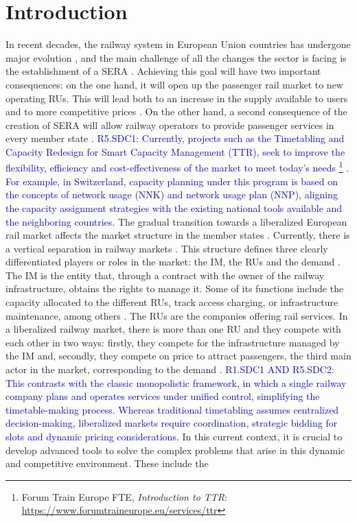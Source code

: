 \documentclass[Afour,sagev,times]{sagej}
\newcommand{\primero}[1]{\textcolor{blue}{#1}}
\newcommand{\quinto}[1]{\textcolor{blue}{#1}}
\begin{document}
\maketitle

\section{Introduction}
\label{sec:introduction}
In recent decades, the railway system in European Union countries has undergone major evolution \cite{Ait2021}, and the main challenge of all the changes the sector is facing is the establishment of a \gls{SERA} \cite{COM2011}. Achieving this goal will have two important consequences: on the one hand, it will open up the passenger rail market to new operating \glspl{RU}. This will lead both to an increase in the supply available to users and to more competitive prices \cite{Caramello2017}. On the other hand, a second consequence of the creation of \gls{SERA} will allow railway operators to provide passenger services in every member state \cite{Caramello2017}. \quinto{R5.SDC1: Currently, projects such as the Timetabling and Capacity Redesign for Smart Capacity Management (TTR), seek to improve the flexibility, efficiency and cost-effectiveness of the market to meet today's needs \footnote{Forum Train Europe FTE, \textit{Introduction to TTR}: \url{https://www.forumtraineurope.eu/services/ttr}} . For example, in Switzerland, capacity planning under this program is based on the concepts of network usage (NNK) and network usage plan (NNP), aligning the capacity assignment strategies with the existing national tools available and the neighboring countries.}  The gradual transition towards a liberalized European rail market affects the market structure in the member states \cite{Ait2021}. Currently, there is a vertical separation in railway markets \cite{Bouf05}. This structure defines three clearly differentiated players or roles in the market: the \gls{IM}, the \glspl{RU} and the demand \cite{Besinovic2024}. The \gls{IM} is the entity that, through a contract with the owner of the railway infrastructure, obtains the rights to manage it. Some of its functions include the capacity allocated to the different \glspl{RU}, track access charging, or infrastructure maintenance, among others \cite{Pena2015}. The \glspl{RU} are the companies offering rail services. In a liberalized railway market, there is more than one \gls{RU} and they compete with each other in two ways: firstly, they compete for the infrastructure managed by the \gls{IM} and, secondly, they compete on price to attract passengers, the third main actor in the market, corresponding to the demand \cite{Link04}. \primero{R1.SDC1 AND R5.SDC2: This contrasts with the classic monopolistic framework, in which a single railway company plans and operates services under unified control, simplifying the timetable-making process. Whereas traditional timetabling assumes centralized decision-making, liberalized markets require coordination, strategic bidding for slots and dynamic pricing considerations}. In this current context, it is crucial to develop advanced tools to solve the complex problems that arise in this dynamic and competitive environment. These include the 
\end{document}
